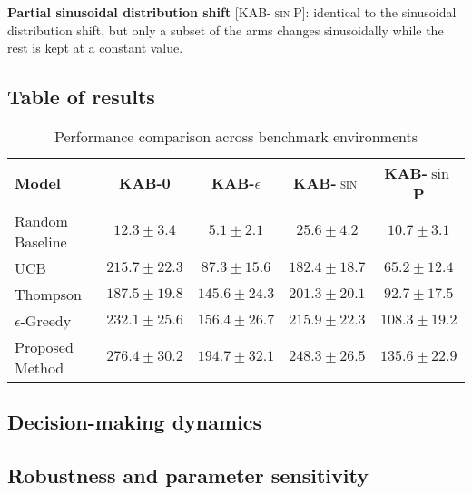 \noindent \textbf{Partial sinusoidal distribution shift} [\textsc{KAB-$\sin$P}]: identical to the sinusoidal distribution shift, but only a subset of the arms changes sinusoidally while the rest is kept at a constant value.


\subsection{Table of results}

\begin{table}[H]
\centering
\caption{Performance comparison across benchmark environments}
\label{tab:model_performance}
\begin{tabular}{l c c c c}
\toprule
\textbf{Model} & \textbf{\textsc{KAB-0}} & \textbf{\textsc{KAB-$\epsilon$}} & \textbf{\textsc{KAB-$\sin$}} & \textbf{KAB-$\sin$P}\\
\midrule
Random Baseline & $12.3 \pm 3.4$ & $5.1 \pm 2.1$ & $25.6 \pm 4.2$ & $10.7 \pm 3.1$ \\
UCB & $215.7 \pm 22.3$ & $87.3 \pm 15.6$ & $182.4 \pm 18.7$ & $65.2 \pm 12.4$ \\
Thompson & $187.5 \pm 19.8$ & $145.6 \pm 24.3$ & $201.3 \pm 20.1$ & $92.7 \pm 17.5$ \\
$\epsilon$-Greedy & $232.1 \pm 25.6$ & $156.4 \pm 26.7$ & $215.9 \pm 22.3$ & $108.3 \pm 19.2$ \\
Proposed Method & $\mathbf{276.4 \pm 30.2}$ & $\mathbf{194.7 \pm 32.1}$ & $\mathbf{248.3 \pm 26.5}$ & $\mathbf{135.6 \pm 22.9}$ \\
\bottomrule
\end{tabular}
\end{table}



\subsection{Decision-making dynamics}


\subsection{Robustness and parameter sensitivity}


